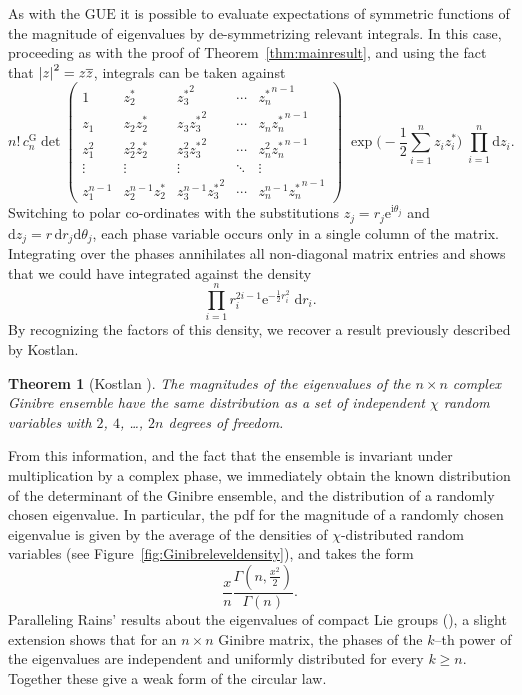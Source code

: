 \documentclass[pdftex, oneside, 10pt, letterpaper]{amsart}
\theoremstyle{plain}
\newtheorem{thm}{Theorem}
\theoremstyle{definition}
\theoremstyle{remark}
\begin{document}
As with the {\ensuremath{\mathrm{GUE}}}{} it is possible to evaluate expectations of
symmetric functions of the magnitude of eigenvalues by de-symmetrizing
relevant integrals.  In this case, proceeding as with the proof of
Theorem~\ref{thm:mainresult}, and using the fact that
${{\ifx\relax{}\relax\else\fi}{{}}\lvert{z}{{}}\rvert}^2=z\overline{z}$, integrals can be taken against
\[
  n!\,c_n^{\mathrm{G}} \det\begin{pmatrix} 1 & {z^*_2} & {z^*_3}^2 &
  \cdots & {z^*_n}^{n-1} \\ z_1 & z_2{z^*_2} & z_3{z^*_3}^2 & \cdots &
  z_n{z^*_n}^{n-1} \\ z_1^2 & z_2^2{z^*_2} & z_3^2{z^*_3}^2 & \cdots &
  z_n^2{z^*_n}^{n-1} \\ \vdots & \vdots & \vdots & \ddots & \vdots
  \\ z_1^{n-1} & z_2^{n-1}{z^*_2} & z_3^{n-1}{z^*_3}^2 & \cdots &
  z_n^{n-1}{z^*_n}^{n-1}
  \end{pmatrix}
  \;\exp\Big(-\frac12\sum_{i=1}^n z_iz^*_i\Big)
  {\;\prod_{i={1}}^{{n}} \mathrm{d}{{z}}_i}.
\]
Switching to polar co-ordinates with the substitutions
$z_j=r_j\mathrm{e}^{\mathrm{i}\theta_j}$ and
$\mathrm{d}z_j=r\,\mathrm{d}r_j\mathrm{d}\theta_j$, each phase
variable occurs only in a single column of the matrix.  Integrating
over the phases annihilates all non-diagonal matrix entries and
shows that we could have integrated against the density
\[
\prod_{i=1}^n
r_i^{2i-1}\mathrm{e}^{-\frac{1}{2}{r_i^2}}\;\mathrm{d}r_i.
\]
By recognizing the factors of this density, we recover a result
previously described by Kostlan.

\begin{thm}[{Kostlan \cite{Kostlan}}]\label{thm:ginibreindep}
  The magnitudes of the eigenvalues of the $n\times{}n$ complex
  Ginibre ensemble have the same distribution as a set of independent
  $\chi$ random variables with $2$, $4$, \dots, $2n$ degrees of
  freedom.
\end{thm}

From this information, and the fact that the ensemble is invariant
under multiplication by a complex phase, we immediately obtain the
known distribution of the determinant of the Ginibre ensemble, and the
distribution of a randomly chosen eigenvalue.  In particular, the pdf
for the magnitude of a randomly chosen eigenvalue is given by the
average of the densities of $\chi$-distributed random variables (see
Figure~\ref{fig:Ginibreleveldensity}), and takes the form
\[
\frac{x}{n}\frac{\Gamma(n,\frac{x^2}{2})}{\Gamma(n)}.
\]
Paralleling Rains' results about the eigenvalues of compact
Lie groups (\cite{Rains-Powers, Rains-power-images}), a slight
extension shows that for an $n\times{}n$ Ginibre matrix, the phases of
the $k$--th power of the eigenvalues are independent and uniformly
distributed for every $k\geq{}n$.  Together these give a weak form of
the circular law.
\end{document}
